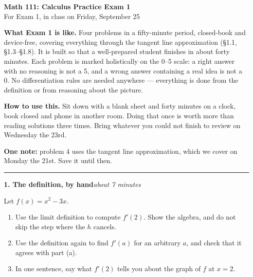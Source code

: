 \documentclass[11pt]{article}
\newcommand{\prob}[2]{\medskip\noindent\textbf{\large #1}\hfill\textit{#2}\par\smallskip}
\begin{document}
\begin{center}
{\Large\bfseries Math 111: Calculus \quad Practice Exam 1}\\[4pt]
{For Exam 1, in class on Friday, September 25}
\end{center}

\medskip
\noindent\textbf{What Exam 1 is like.} Four problems in a fifty-minute period, closed-book
and device-free, covering everything through the tangent line approximation
(\S1.1, \S1.3--\S1.8). It is built so that a well-prepared student finishes in about forty
minutes. Each problem is marked holistically on the 0--5 scale: a right answer with no
reasoning is not a 5, and a wrong answer containing a real idea is not a 0. No
differentiation rules are needed anywhere --- everything is done from the definition or
from reasoning about the picture.

\smallskip
\noindent\textbf{How to use this.} Sit down with a blank sheet and forty minutes on a
clock, book closed and phone in another room. Doing that once is worth more than reading
solutions three times. Bring whatever you could not finish to review on Wednesday the 23rd.

\smallskip
\noindent\textbf{One note:} problem 4 uses the tangent line approximation, which we cover
on Monday the 21st. Save it until then.

\bigskip\hrule

\prob{1. The definition, by hand}{about 7 minutes}
Let $f(x) = x^2 - 3x$.
\begin{enumerate}
\item Use the limit definition to compute $f'(2)$. Show the algebra, and do not skip the
step where the $h$ cancels.
\item Use the definition again to find $f'(a)$ for an arbitrary $a$, and check that it
agrees with part (a).
\item In one sentence, say what $f'(2)$ tells you about the graph of $f$ at $x=2$.
\end{enumerate}
\end{document}
